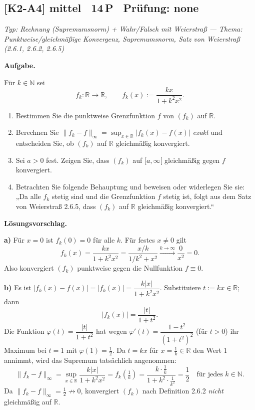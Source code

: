 \documentclass[a4paper,11pt]{article}
\begin{document}
\subsection*{[K2-A4] \normalfont mittel \textbullet\ 14\,P \textbullet\ Pr\"ufung: none}
\textit{Typ: Rechnung (Supremumsnorm) + Wahr/Falsch mit Weierstraß  ---  Thema: Punktweise/gleichmäßige Konvergenz, Supremumsnorm, Satz von Weierstraß (2.6.1, 2.6.2, 2.6.5)}\par\smallskip
\textbf{Aufgabe.}\par
Für $k\in\mathbb{N}$ sei
\[f_k:\mathbb{R}\to\mathbb{R},\qquad f_k(x):=\frac{kx}{1+k^2x^2}.\]
\begin{enumerate}[label=\alph*)]
  \item Bestimmen Sie die punktweise Grenzfunktion $f$ von $(f_k)$ auf $\mathbb{R}$.
  \item Berechnen Sie $\|f_k-f\|_\infty=\sup_{x\in\mathbb{R}}|f_k(x)-f(x)|$ \emph{exakt} und entscheiden Sie, ob $(f_k)$ auf $\mathbb{R}$ gleichmäßig konvergiert.
  \item Sei $a>0$ fest. Zeigen Sie, dass $(f_k)$ auf $[a,\infty[$ gleichmäßig gegen $f$ konvergiert.
  \item Betrachten Sie folgende Behauptung und beweisen oder widerlegen Sie sie: „Da alle $f_k$ stetig sind und die Grenzfunktion $f$ stetig ist, folgt aus dem Satz von Weierstraß 2.6.5, dass $(f_k)$ auf $\mathbb{R}$ gleichmäßig konvergiert.“
\end{enumerate}\par\smallskip
\textbf{L\"osungsvorschlag.}\par
\textbf{a)} Für $x=0$ ist $f_k(0)=0$ für alle $k$. Für festes $x\neq0$ gilt
\[f_k(x)=\frac{kx}{1+k^2x^2}=\frac{x/k}{1/k^2+x^2}\xrightarrow{k\to\infty}\frac{0}{x^2}=0.\]
Also konvergiert $(f_k)$ punktweise gegen die Nullfunktion $f\equiv 0$.

\textbf{b)} Es ist $|f_k(x)-f(x)|=|f_k(x)|=\dfrac{k|x|}{1+k^2x^2}$. Substituiere $t:=k x\in\mathbb{R}$; dann
\[|f_k(x)|=\frac{|t|}{1+t^2}.\]
Die Funktion $\varphi(t)=\dfrac{|t|}{1+t^2}$ hat wegen $\varphi'(t)=\dfrac{1-t^2}{(1+t^2)^2}$ (für $t>0$) ihr Maximum bei $t=1$ mit $\varphi(1)=\tfrac12$. Da $t=kx$ für $x=\tfrac1k\in\mathbb{R}$ den Wert $1$ annimmt, wird das Supremum tatsächlich angenommen:
\[\|f_k-f\|_\infty=\sup_{x\in\mathbb{R}}\frac{k|x|}{1+k^2x^2}=f_k\!\left(\tfrac1k\right)=\frac{k\cdot\frac1k}{1+k^2\cdot\frac1{k^2}}=\frac{1}{2}\quad\text{für jedes }k\in\mathbb{N}.\]
Da $\|f_k-f\|_\infty=\tfrac12\not\to0$, konvergiert $(f_k)$ nach Definition 2.6.2 \emph{nicht} gleichmäßig auf $\mathbb{R}$.
\end{document}
